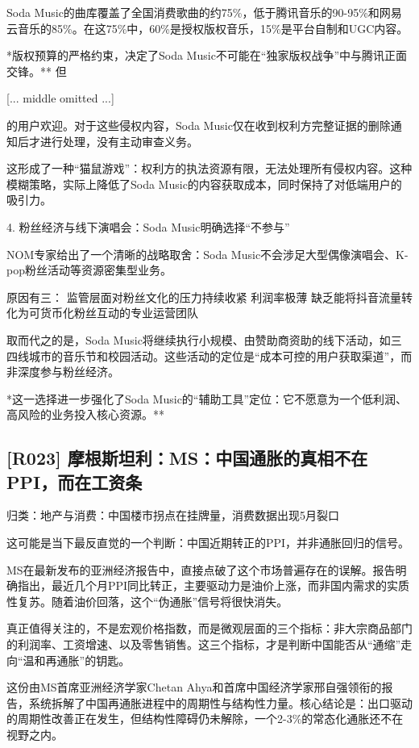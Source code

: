 \documentclass[11pt]{ctexart}
\begin{document}
Soda Music的曲库覆盖了全国消费歌曲的约75\%，低于腾讯音乐的90-95\%和网易云音乐的85\%。在这75\%中，60\%是授权版权音乐，15\%是平台自制和UGC内容。

*版权预算的严格约束，决定了Soda Music不可能在“独家版权战争”中与腾讯正面交锋。** 但

[... middle omitted ...]

的用户欢迎。对于这些侵权内容，Soda Music仅在收到权利方完整证据的删除通知后才进行处理，没有主动审查义务。

这形成了一种“猫鼠游戏”：权利方的执法资源有限，无法处理所有侵权内容。这种模糊策略，实际上降低了Soda Music的内容获取成本，同时保持了对低端用户的吸引力。

4. 粉丝经济与线下演唱会：Soda Music明确选择“不参与”

NOM专家给出了一个清晰的战略取舍：Soda Music不会涉足大型偶像演唱会、K-pop粉丝活动等资源密集型业务。

原因有三： 监管层面对粉丝文化的压力持续收紧 利润率极薄 缺乏能将抖音流量转化为可货币化粉丝互动的专业运营团队

取而代之的是，Soda Music将继续执行小规模、由赞助商资助的线下活动，如三四线城市的音乐节和校园活动。这些活动的定位是“成本可控的用户获取渠道”，而非深度参与粉丝经济。

*这一选择进一步强化了Soda Music的“辅助工具”定位：它不愿意为一个低利润、高风险的业务投入核心资源。**

\subsection{[R023] 摩根斯坦利：MS：中国通胀的真相不在PPI，而在工资条}
{\small\color{refgray}归类：地产与消费：中国楼市拐点在挂牌量，消费数据出现5月裂口}

这可能是当下最反直觉的一个判断：中国近期转正的PPI，并非通胀回归的信号。

MS在最新发布的亚洲经济报告中，直接点破了这个市场普遍存在的误解。报告明确指出，最近几个月PPI同比转正，主要驱动力是油价上涨，而非国内需求的实质性复苏。随着油价回落，这个“伪通胀”信号将很快消失。

真正值得关注的，不是宏观价格指数，而是微观层面的三个指标：非大宗商品部门的利润率、工资增速、以及零售销售。这三个指标，才是判断中国能否从“通缩”走向“温和再通胀”的钥匙。

这份由MS首席亚洲经济学家Chetan Ahya和首席中国经济学家邢自强领衔的报告，系统拆解了中国再通胀进程中的周期性与结构性力量。核心结论是：出口驱动的周期性改善正在发生，但结构性障碍仍未解除，一个2-3\%的常态化通胀还不在视野之内。
\end{document}
